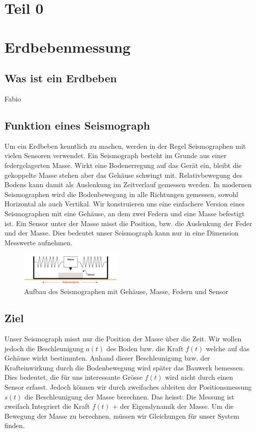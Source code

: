 %
%
\section{Teil 0\label{erdbeben:section:teil0}}
\section{Erdbebenmessung}
\subsection{Was ist ein Erdbeben}
Fabio
\subsection{Funktion eines Seismograph}
Um ein Erdbeben kenntlich zu machen, werden in der Regel Seismographen mit vielen Sensoren verwendet. 
Ein Seismograph besteht im Grunde aus einer federgelagerten Masse. Wirkt eine Bodenerregung auf das Gerät ein, bleibt die gekoppelte Masse stehen aber das Gehäuse schwingt mit.
Relativbewegung des Bodens kann damit als Auslenkung im Zeitverlauf gemessen werden.
In modernen Seismographen wird die Bodenbewegung in alle Richtungen gemessen, sowohl Horizontal als auch Vertikal. 
Wir konstruieren uns eine einfachere Version eines Seismographen mit eine Gehäuse, an dem zwei Federn und eine Masse befestigt ist. 
Ein Sensor unter der Masse misst die Position, bzw. die Auslenkung der Feder und der Masse.
Dies bedeutet unser Seismograph kann nur in eine Dimension Messwerte aufnehmen. 

\begin{figure}
 \begin{center}
 \includegraphics[width=5cm]{papers/erdbeben/Apperatur}
 \caption{Aufbau des Seismographen mit Gehäuse, Masse, Federn und Sensor}
 \end{center}
\end{figure}

\subsection{Ziel}
Unser Seismograph misst nur die Position der Masse über die Zeit. 
Wir wollen jedoch die Beschleunigung $a(t)$ des Boden bzw. die Kraft $f(t)$ welche auf das Gehäuse wirkt bestimmten.  
Anhand dieser Beschleunigung bzw. der Krafteinwirkung durch die Bodenbewegung wird später das Bauwerk bemessen.
Dies bedeutet, die für uns interessante Grösse $f(t)$ wird nicht durch einen Sensor erfasst. 
Jedoch können wir durch zweifaches ableiten der Positionsmessung $s(t)$ die Beschleunigung der Masse berechnen. 
Das heisst: Die Messung ist zweifach Integriert die Kraft $f(t)$ + der Eigendynamik der Masse.
Um die Bewegung der Masse zu berechnen, müssen wir Gleichungen für unser System finden.

